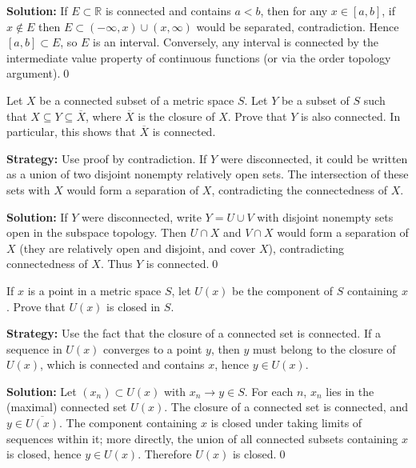 \bigskip\noindent\textbf{Solution:}
If $E\subset\mathbb{R}$ is connected and contains $a<b$, then for any $x\in[a,b]$, if $x\notin E$ then $E\subset(-\infty,x)\cup(x,\infty)$ would be separated, contradiction. Hence $[a,b]\subset E$, so $E$ is an interval. Conversely, any interval is connected by the intermediate value property of continuous functions (or via the order topology argument).\qed



\begin{problembox}
Let $X$ be a connected subset of a metric space $S$. Let $Y$ be a subset of $S$ such that $X \subseteq Y \subseteq \overline{X}$, where $\overline{X}$ is the closure of $X$. Prove that $Y$ is also connected. In particular, this shows that $\overline{X}$ is connected.
\end{problembox}

\noindent\textbf{Strategy:} Use proof by contradiction. If $Y$ were disconnected, it could be written as a union of two disjoint nonempty relatively open sets. The intersection of these sets with $X$ would form a separation of $X$, contradicting the connectedness of $X$.

\bigskip\noindent\textbf{Solution:}
If $Y$ were disconnected, write $Y=U\cup V$ with disjoint nonempty sets open in the subspace topology. Then $U\cap X$ and $V\cap X$ would form a separation of $X$ (they are relatively open and disjoint, and cover $X$), contradicting connectedness of $X$. Thus $Y$ is connected.\qed



\begin{problembox}
If $x$ is a point in a metric space $S$, let $U(x)$ be the component of $S$ containing $x$. Prove that $U(x)$ is closed in $S$.
\end{problembox}

\noindent\textbf{Strategy:} Use the fact that the closure of a connected set is connected. If a sequence in $U(x)$ converges to a point $y$, then $y$ must belong to the closure of $U(x)$, which is connected and contains $x$, hence $y \in U(x)$.

\bigskip\noindent\textbf{Solution:}
Let $(x_n)\subset U(x)$ with $x_n\to y\in S$. For each $n$, $x_n$ lies in the (maximal) connected set $U(x)$. The closure of a connected set is connected, and $y\in\overline{U(x)}$. The component containing $x$ is closed under taking limits of sequences within it; more directly, the union of all connected subsets containing $x$ is closed, hence $y\in U(x)$. Therefore $U(x)$ is closed.\qed




